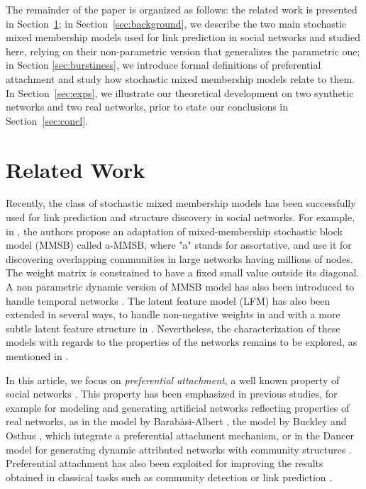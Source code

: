 The remainder of the paper is organized as follows: the related work is presented in Section~\ref{sec:rel-work}; in Section~\ref{sec:background}, we describe the two main stochastic mixed membership models used for link prediction in social networks and studied here, relying on their non-parametric version that generalizes the parametric one; in Section \ref{sec:burstiness}, we introduce formal definitions of preferential attachment and study how stochastic mixed membership models relate to them. In Section~\ref{sec:exps}, we illustrate our theoretical development on two synthetic networks and two real networks, prior to state our conclusions in Section~\ref{sec:concl}.

\section{Related Work}
\label{sec:rel-work}

Recently,  the class of stochastic mixed membership models has been successfully used for link prediction and structure discovery in social networks. For example, in \cite{AMMSB}, the authors  propose an adaptation of mixed-membership stochastic block model (MMSB) called a-MMSB, where "a" stands for assortative, and use it for discovering overlapping communities in large networks having millions of nodes. The weight matrix is constrained to have a fixed small value outside its diagonal. A non parametric dynamic version of MMSB model has also been introduced to  handle temporal networks \cite{fan2015dynamic}. The latent feature model (LFM) has also been extended in several ways, to handle non-negative weights in \cite{IMRM} and with a more subtle latent feature structure in \cite{ILAM}. Nevertheless, the characterization of these models with regards to the properties of the networks remains to be explored, as mentioned in \cite{jacobs2014unified}.

In this article, we focus on \textit{preferential attachment}, a well known property of social networks \cite{Newman2010, Barabasi2003}. This property has been emphasized in previous studies, for example for modeling and generating artificial networks reflecting properties of real networks, as in the model by Barab\`asi-Albert \cite{albert2002statistical}, the model by Buckley and Osthus \cite{Buckley2001}, which integrate a preferential attachment mechanism, or in the Dancer model for generating dynamic attributed networks with community structures \cite{Largeron2017}. Preferential attachment has also  been exploited for improving the results obtained in classical tasks such as community detection \cite{Ciglan2013} or link prediction \cite{Zeng2016}.

